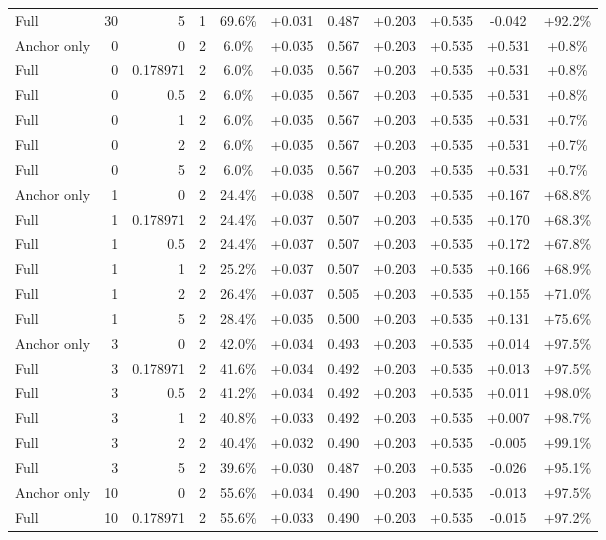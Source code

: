 \begin{table}[htbp]
\begin{tabular}{lrrrccccccc}
Full & 30 & 5 & 1 & 69.6\% & +0.031 & 0.487 & +0.203 & +0.535 & -0.042 & +92.2\% \\
Anchor only & 0 & 0 & 2 & 6.0\% & +0.035 & 0.567 & +0.203 & +0.535 & +0.531 & +0.8\% \\
Full & 0 & 0.178971 & 2 & 6.0\% & +0.035 & 0.567 & +0.203 & +0.535 & +0.531 & +0.8\% \\
Full & 0 & 0.5 & 2 & 6.0\% & +0.035 & 0.567 & +0.203 & +0.535 & +0.531 & +0.8\% \\
Full & 0 & 1 & 2 & 6.0\% & +0.035 & 0.567 & +0.203 & +0.535 & +0.531 & +0.7\% \\
Full & 0 & 2 & 2 & 6.0\% & +0.035 & 0.567 & +0.203 & +0.535 & +0.531 & +0.7\% \\
Full & 0 & 5 & 2 & 6.0\% & +0.035 & 0.567 & +0.203 & +0.535 & +0.531 & +0.7\% \\
Anchor only & 1 & 0 & 2 & 24.4\% & +0.038 & 0.507 & +0.203 & +0.535 & +0.167 & +68.8\% \\
Full & 1 & 0.178971 & 2 & 24.4\% & +0.037 & 0.507 & +0.203 & +0.535 & +0.170 & +68.3\% \\
Full & 1 & 0.5 & 2 & 24.4\% & +0.037 & 0.507 & +0.203 & +0.535 & +0.172 & +67.8\% \\
Full & 1 & 1 & 2 & 25.2\% & +0.037 & 0.507 & +0.203 & +0.535 & +0.166 & +68.9\% \\
Full & 1 & 2 & 2 & 26.4\% & +0.037 & 0.505 & +0.203 & +0.535 & +0.155 & +71.0\% \\
Full & 1 & 5 & 2 & 28.4\% & +0.035 & 0.500 & +0.203 & +0.535 & +0.131 & +75.6\% \\
Anchor only & 3 & 0 & 2 & 42.0\% & +0.034 & 0.493 & +0.203 & +0.535 & +0.014 & +97.5\% \\
Full & 3 & 0.178971 & 2 & 41.6\% & +0.034 & 0.492 & +0.203 & +0.535 & +0.013 & +97.5\% \\
Full & 3 & 0.5 & 2 & 41.2\% & +0.034 & 0.492 & +0.203 & +0.535 & +0.011 & +98.0\% \\
Full & 3 & 1 & 2 & 40.8\% & +0.033 & 0.492 & +0.203 & +0.535 & +0.007 & +98.7\% \\
Full & 3 & 2 & 2 & 40.4\% & +0.032 & 0.490 & +0.203 & +0.535 & -0.005 & +99.1\% \\
Full & 3 & 5 & 2 & 39.6\% & +0.030 & 0.487 & +0.203 & +0.535 & -0.026 & +95.1\% \\
Anchor only & 10 & 0 & 2 & 55.6\% & +0.034 & 0.490 & +0.203 & +0.535 & -0.013 & +97.5\% \\
Full & 10 & 0.178971 & 2 & 55.6\% & +0.033 & 0.490 & +0.203 & +0.535 & -0.015 & +97.2\% \\

\end{tabular}
\end{table}
